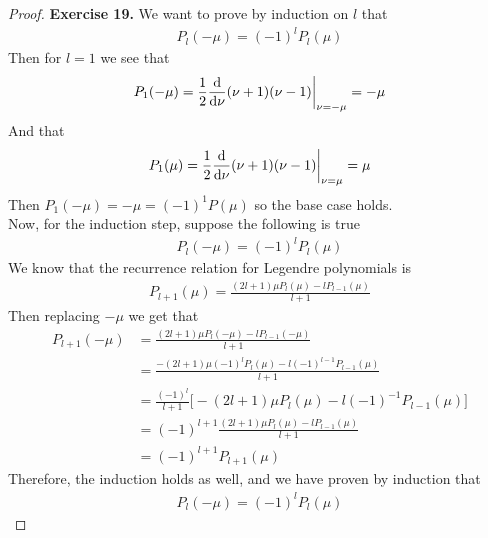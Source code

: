 \documentclass[11pt]{article}
\theoremstyle{definition}
\begin{document}
\cleardoublepage
\begin{proof}{\textbf{Exercise 19.}}
We want to prove by induction on $l$ that
\begin{align*}
    P_l(-\mu) = (-1)^lP_l(\mu)
\end{align*}
Then for $l = 1$ we see that
\begin{align*}
    P_1(-\mu) = \frac{1}{2}\dv{\nu}(\nu + 1)(\nu - 1) \bigg|_{\nu = -\mu}
    = -\mu
\end{align*}
And that
\begin{align*}
    P_1(\mu) = \frac{1}{2}\dv{\nu}(\nu + 1)(\nu - 1) \bigg|_{\nu = \mu}
    = \mu
\end{align*}
Then $P_1(-\mu) = -\mu = (-1)^1P(\mu)$ so the base case holds.
\\
Now, for the induction step, suppose the following is true
\begin{align*}
    P_{l}(-\mu) = (-1)^{l}P_{l}(\mu)
\end{align*}
We know that the recurrence relation for Legendre polynomials is
\begin{align*}
    P_{l + 1}(\mu) = \frac{(2l + 1)\mu P_l(\mu) - lP_{l-1}(\mu)}{l + 1}
\end{align*}
Then replacing $-\mu$ we get that
\begin{align*}
    P_{l + 1}(-\mu)
    &= \frac{(2l + 1)\mu P_l(-\mu) - lP_{l-1}(-\mu)}{l + 1}\\
    &= \frac{-(2l + 1)\mu (-1)^{l}P_{l}(\mu) - l(-1)^{l-1}P_{l-1}(\mu)}{l + 1}\\
    &= \frac{(-1)^{l}}{l + 1}
    \bigg[-(2l + 1)\mu P_{l}(\mu) - l(-1)^{-1}P_{l-1}(\mu)\bigg]\\
    &= (-1)^{l + 1}\frac{(2l + 1)\mu P_{l}(\mu) - lP_{l-1}(\mu)}{l + 1}\\
    &= (-1)^{l + 1}P_{l+1}(\mu)
\end{align*}
Therefore, the induction holds as well, and we have proven by induction that
\begin{align*}
    P_l(-\mu) = (-1)^lP_l(\mu)
\end{align*}
\end{proof}
\end{document}
